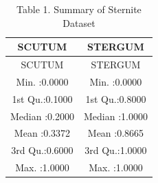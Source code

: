 \begin{longtable}[]{@{}cc@{}}
\caption{Table 1. Summary of Sternite Dataset}\tabularnewline
\toprule
\begin{minipage}[b]{0.22\columnwidth}\centering\strut
SCUTUM\strut
\end{minipage} & \begin{minipage}[b]{0.22\columnwidth}\centering\strut
STERGUM\strut
\end{minipage}\tabularnewline
\midrule
\endfirsthead
\toprule
\begin{minipage}[b]{0.22\columnwidth}\centering\strut
SCUTUM\strut
\end{minipage} & \begin{minipage}[b]{0.22\columnwidth}\centering\strut
STERGUM\strut
\end{minipage}\tabularnewline
\midrule
\endhead
\begin{minipage}[t]{0.22\columnwidth}\centering\strut
Min. :0.0000\strut
\end{minipage} & \begin{minipage}[t]{0.22\columnwidth}\centering\strut
Min. :0.0000\strut
\end{minipage}\tabularnewline
\begin{minipage}[t]{0.22\columnwidth}\centering\strut
1st Qu.:0.1000\strut
\end{minipage} & \begin{minipage}[t]{0.22\columnwidth}\centering\strut
1st Qu.:0.8000\strut
\end{minipage}\tabularnewline
\begin{minipage}[t]{0.22\columnwidth}\centering\strut
Median :0.2000\strut
\end{minipage} & \begin{minipage}[t]{0.22\columnwidth}\centering\strut
Median :1.0000\strut
\end{minipage}\tabularnewline
\begin{minipage}[t]{0.22\columnwidth}\centering\strut
Mean :0.3372\strut
\end{minipage} & \begin{minipage}[t]{0.22\columnwidth}\centering\strut
Mean :0.8665\strut
\end{minipage}\tabularnewline
\begin{minipage}[t]{0.22\columnwidth}\centering\strut
3rd Qu.:0.6000\strut
\end{minipage} & \begin{minipage}[t]{0.22\columnwidth}\centering\strut
3rd Qu.:1.0000\strut
\end{minipage}\tabularnewline
\begin{minipage}[t]{0.22\columnwidth}\centering\strut
Max. :1.0000\strut
\end{minipage} & \begin{minipage}[t]{0.22\columnwidth}\centering\strut
Max. :1.0000\strut
\end{minipage}\tabularnewline
\bottomrule
\end{longtable}

